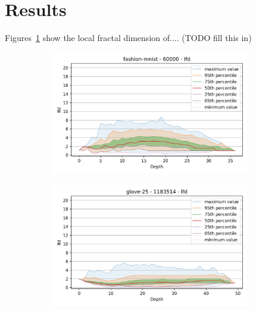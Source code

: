 \section{Results}
\label{sec:results}

Figures~\ref{fig:results:fashion-mnist-lfd} show the local fractal dimension of.... (TODO fill this in)


\begin{figure}
\begin{subfigure}[b]{0.47\textwidth}
\includegraphics[width=0.95\textwidth]{images/lfd_plots/fashion-mnist-60000-lfd.png}\\
\label{fig:results:fashion-mnist-lfd}
\end{subfigure}%
\begin{subfigure}[b]{0.47\textwidth}
\includegraphics[width=0.95\textwidth]{images/lfd_plots/glove-25-1183514-lfd.png}\\
\label{fig:results:glove-25-lfd}
\end{subfigure}

\end{figure}
